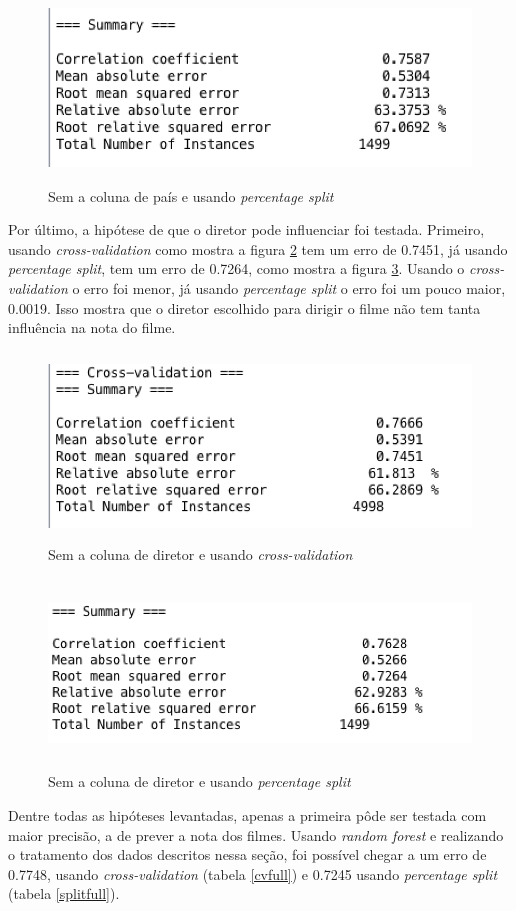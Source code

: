 \begin{figure}[H]
\centering
\includegraphics[height=5cm]{imagens/no_country_split.png}
\caption{Sem a coluna de país e usando \textit{percentage split}}
\label{nocountrysplit}
\end{figure}


Por último, a hipótese de que o diretor pode influenciar foi testada. Primeiro, usando \textit{cross-validation} como mostra a figura \ref{nodirectorcv} tem um erro de 0.7451, já usando \textit{percentage split}, tem um erro de 0.7264, como mostra a figura \ref{nodirectorsplit}. Usando o \textit{cross-validation} o erro foi menor, já usando \textit{percentage split} o erro foi um pouco maior, 0.0019. Isso mostra que o diretor escolhido para dirigir o filme não tem tanta influência na nota do filme. 

\begin{figure}[H]
\centering
\includegraphics[height=5cm]{imagens/no_director_cv.png}
\caption{Sem a coluna de diretor e usando \textit{cross-validation}}
\label{nodirectorcv}
\end{figure}

\begin{figure}[H]
\centering
\includegraphics[height=5cm]{imagens/no_director_split.png}
\caption{Sem a coluna de diretor e usando \textit{percentage split}}
\label{nodirectorsplit}
\end{figure}

Dentre todas as hipóteses levantadas, apenas a primeira pôde ser testada com maior precisão, a de prever a nota dos filmes. Usando \textit{random forest} e realizando o tratamento dos dados descritos nessa seção, foi possível chegar a um erro de 0.7748, usando \textit{cross-validation} (tabela \ref{cvfull}) e 0.7245 usando \textit{percentage split} (tabela \ref{splitfull}). 
